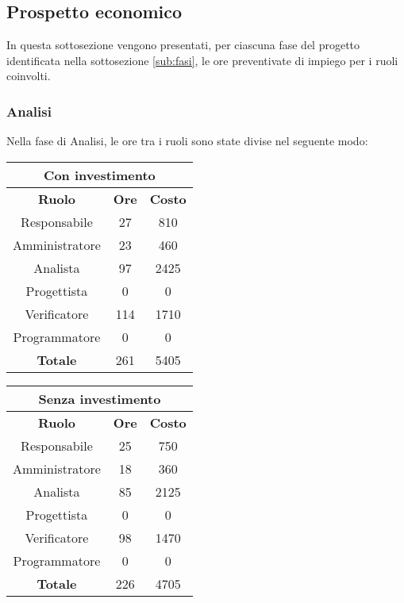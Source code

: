 \documentclass{scalatekids-article}
\begin{document}
\subsection{Prospetto economico}
In questa sottosezione vengono presentati, per ciascuna fase del progetto identificata
nella sottosezione \ref{sub:fasi}, le ore preventivate di impiego per i ruoli coinvolti.
\subsubsection{Analisi}
Nella fase di Analisi, le ore tra i ruoli sono state divise nel seguente modo:
\begin{center}
  \normalsize
  \begin{tabular}{| c | c | c |}
    \hline
    \multicolumn{3}{|c|}{\textbf{Con investimento}}\\
    \hline
    \textbf{Ruolo} & \textbf{Ore} & \textbf{Costo}\\
    \hline
    Responsabile & 27 & 810\\
    Amministratore & 23 & 460\\
    Analista & 97 & 2425\\
    Progettista & 0 & 0\\
    Verificatore & 114 & 1710 \\
    Programmatore & 0 & 0 \\
    \hline
    \textbf{Totale} & 261 & 5405\\
    \hline
  \end{tabular}
  \qquad
  \begin{tabular}{| c | c | c |}
    \hline
    \multicolumn{3}{|c|}{\textbf{Senza investimento}}\\
    \hline
    \textbf{Ruolo} & \textbf{Ore} & \textbf{Costo}\\
    \hline
    Responsabile & 25 & 750\\
    Amministratore & 18 & 360\\
    Analista & 85 & 2125\\
    Progettista & 0 & 0\\
    Verificatore & 98 & 1470 \\
    Programmatore & 0 & 0 \\
    \hline
    \textbf{Totale} & 226 & 4705\\
    \hline
  \end{tabular}
\end{center}
\end{document}
